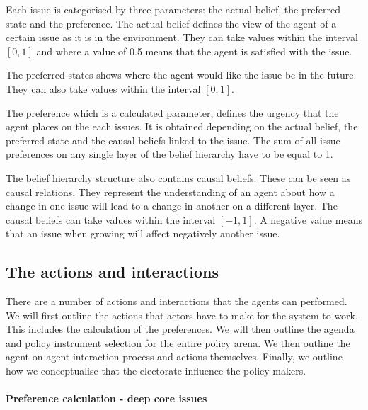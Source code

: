 \documentclass[11pt]{article}
\begin{document}
Each issue is categorised by three parameters: the actual belief, the preferred state and the preference. The actual belief defines the view of the agent of a certain issue as it is in the environment. They can take values within the interval $[0, 1]$ and where a value of 0.5 means that the agent is satisfied with the issue.

The preferred states shows where the agent would like the issue be in the future. They can also take values within the interval $[0, 1]$.

The preference which is a calculated parameter, defines the urgency that the agent places on the each issues. It is obtained depending on the actual belief, the preferred state and the causal beliefs linked to the issue. The sum of all issue preferences on any single layer of the belief hierarchy have to be equal to 1.

The belief hierarchy structure also contains causal beliefs. These can be seen as causal relations. They represent the understanding of an agent about how a change in one issue will lead to a change in another on a different layer. The causal beliefs can take values within the interval $[-1, 1]$. A negative value means that an issue when growing will affect negatively another issue.



\subsection{The actions and interactions}


There are a number of actions and interactions that the agents can performed. We will first outline the actions that actors have to make for the system to work. This includes the calculation of the preferences. We will then outline the agenda and policy instrument selection for the entire policy arena. We then outline the agent on agent interaction process and actions themselves. Finally, we outline how we conceptualise that the electorate influence the policy makers.

\paragraph{Preference calculation - deep core issues}
\end{document}
